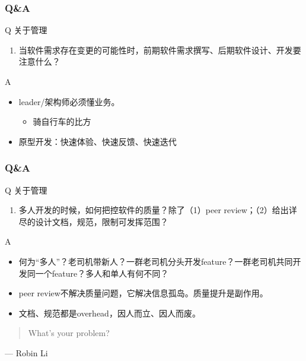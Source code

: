 \documentclass[UTF8,lualatex]{ctexbeamer}
\newcommand{\pagequote}[2]{
  \Large
  \begin{quotation}
      #1
  \end{quotation}
  \flushright\normalsize --- {#2}
}
\begin{document}
\begin{frame}
    \frametitle{Q\&A}
    \begin{alertblock}{Q}
        关于管理
        \begin{enumerate}
            \item 当软件需求存在变更的可能性时，前期软件需求撰写、后期软件设计、开发要注意什么？
        \end{enumerate}
    \end{alertblock}
    \begin{block}{A}
        \begin{itemize}
            \item leader/架构师必须懂业务。
                \begin{itemize}
                    \item 骑自行车的比方
                \end{itemize}
            \item 原型开发：快速体验、快速反馈、快速迭代
        \end{itemize}
    \end{block}
\end{frame}

\begin{frame}
    \frametitle{Q\&A}
    \begin{alertblock}{Q}
        关于管理
        \begin{enumerate}
            \item 多人开发的时候，如何把控软件的质量？除了（1）peer review；（2）给出详尽的设计文档，规范，限制可发挥范围？
        \end{enumerate}
    \end{alertblock}
    \begin{block}{A}
        \begin{itemize}
            \item 何为“多人”？老司机带新人？一群老司机分头开发feature？一群老司机共同开发同一个feature？多人和单人有何不同？
            \item peer review不解决质量问题，它解决信息孤岛。质量提升是副作用。
            \item 文档、规范都是overhead，因人而立、因人而废。
        \end{itemize}
    \end{block}
\end{frame}

\begin{frame}
    \pagequote{What's your problem?}{Robin Li}
\end{frame}
\end{document}
